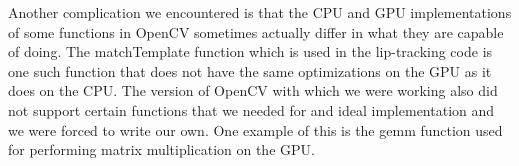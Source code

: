 Another complication we encountered is that the CPU and GPU implementations of some functions in OpenCV sometimes actually differ in what they are capable of doing. The matchTemplate function which is used in the lip-tracking code is one such function that does not have the same optimizations on the GPU as it does on the CPU. The version of OpenCV with which we were working also did not support certain functions that we needed for and ideal implementation and we were forced to write our own. One example of this is the gemm function used for performing matrix multiplication on the GPU.